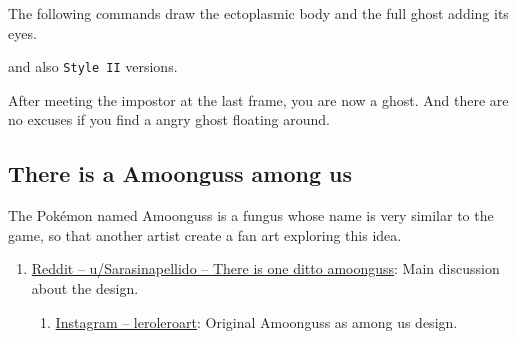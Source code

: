 \documentclass[12pt]{article}
\newenvironment{FHZtcbEnumerate}{%
  \begin{FHZboxEnumerateStyle}\begin{enumerate}}
    {\end{enumerate}\end{FHZboxEnumerateStyle}
}
\begin{document}
The following commands draw the ectoplasmic body and the full ghost adding its eyes.
\begin{FHZtcbAmongUs}
\end{FHZtcbAmongUs}
and also \texttt{Style II} versions.

After meeting the impostor at the last frame, you are now a ghost. And there are no excuses if you find a angry ghost floating around.
\begin{FHZtcbAmongUs}[title=Oh no! Now you are a Ghost!]
\end{FHZtcbAmongUs}

\subsection{There is a Amoonguss among us}

The Pokémon named Amoonguss is a fungus whose name is very similar to the game, so that another artist create a fan art exploring this idea.
\begin{FHZtcbEnumerate}
  \item \href{https://www.reddit.com/r/AmongUs/comments/insse3/there_is_one_ditto_amoonguss/}{Reddit -- u/Sarasinapellido -- There is one ditto amoonguss}: Main discussion about the design.

  \begin{enumerate}
    \item \href{https://www.instagram.com/p/CEzs-cNKuQJ/}{Instagram -- leroleroart}: Original Amoonguss as among us design.
  \end{enumerate}
\end{FHZtcbEnumerate}
\end{document}
